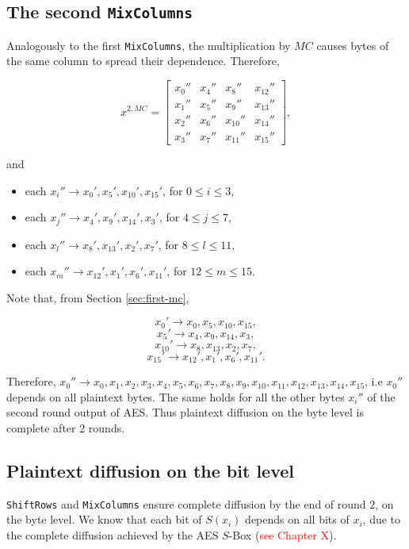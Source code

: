 \documentclass{report}
\begin{document}
\subsection{The second \texttt{MixColumns}}\label{sec:second-mc}
Analogously to the first \texttt{MixColumns}, the multiplication by $MC$ causes bytes of the same column to spread their dependence. Therefore,

\begin{equation*}
x^{2, MC} = 
\begin{bmatrix}
x_0'' & x_4'' & x_8'' & x_{12}''\\
x_1'' & x_5'' & x_9'' & x_{13}''\\
x_2'' & x_6'' & x_{10}'' & x_{14}''\\
x_3'' & x_7'' & x_{11}'' & x_{15}''
\end{bmatrix},
\end{equation*}

and

\begin{itemize}
    \item each $x_i''\rightarrow x_0', x_5', x_{10}', x_{15}'$, for $0 \leq i \leq 3$,
    \item each $x_j''\rightarrow x_4', x_9', x_{14}', x_{3}'$, for $4 \leq j \leq 7$,
    \item each $x_l''\rightarrow x_8', x_{13}', x_{2}', x_{7}'$, for $8 \leq l \leq 11$,
    \item each $x_m''\rightarrow x_{12}', x_{1}', x_{6}', x_{11}'$, for $12 \leq m \leq 15$.
\end{itemize}

Note that, from Section \ref{sec:first-mc}, 

$$x_0' \rightarrow x_0, x_5, x_{10}, x_{15},$$
$$x_5' \rightarrow x_4, x_9, x_{14}, x_{3},$$
$$x_{10}' \rightarrow x_8, x_{13}, x_{2}, x_{7},$$
$$x_{15}' \rightarrow x_{12}', x_{1}', x_{6}', x_{11}'.$$

Therefore, $x_0'' \rightarrow x_0, x_1, x_2, x_3, x_4, x_5, x_6, x_7, x_8, x_9, x_{10}, x_{11}, x_{12}, x_{13}, x_{14}, x_{15}$, i.e $x_0''$ depends on all plaintext bytes. The same holds for all the other bytes $x_i''$ of the second round output of AES. Thus plaintext diffusion on the byte level is complete after 2 rounds.

\subsection{Plaintext diffusion on the bit level}\label{sec:bit-level}
\texttt{ShiftRows} and \texttt{MixColumns} ensure complete diffusion by the end of round $2$, on the byte level. We know that each bit of $S(x_i)$ depends on all bits of $x_i$, due to the complete diffusion achieved by the AES $S$-Box (\textcolor{red}{see Chapter X}).
\end{document}
